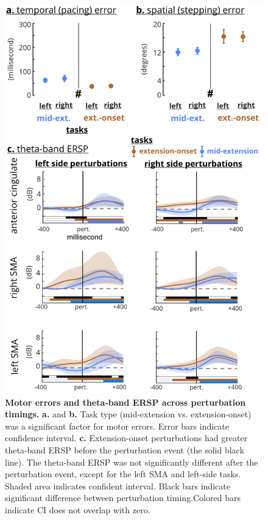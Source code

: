 \documentclass[shortpaper,twoside,web]{ieeecolor}
\begin{document}
\begin{figure}[!t]
\centerline{\includegraphics{figures/hyp3 - perturb timing.jpg}}
\caption{\textbf{Motor errors and theta-band ERSP across perturbation timings.} \textbf{a.} and \textbf{b.} Task type (mid-extension vs. extension-onset) was a significant factor for motor errors. Error bars indicate confidence interval. \textbf{c.} Extension-onset perturbations had greater theta-band ERSP before the perturbation event (the solid black line). The theta-band ERSP was not significantly different after the perturbation event, except for the left SMA and left-side tasks. Shaded area indicates confident interval. Black bars indicate significant difference between perturbation timing.Colored bars indicate CI does not overlap with zero.}
\label{fig8}
\end{figure}
\end{document}
